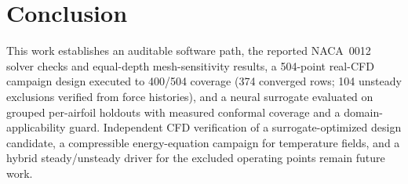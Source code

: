 \documentclass[11pt]{article}
\begin{document}
\section{Conclusion}
\label{sec:conclusion}

This work establishes an auditable software path, the reported NACA~0012
solver checks and equal-depth mesh-sensitivity results, a 504-point real-CFD
campaign design executed to 400/504 coverage (374 converged rows; 104
unsteady exclusions verified from force histories), and a neural surrogate
evaluated on grouped per-airfoil holdouts with measured conformal coverage
and a domain-applicability guard. Independent CFD verification of a
surrogate-optimized design candidate, a compressible energy-equation
campaign for temperature fields, and a hybrid steady/unsteady driver for
the excluded operating points remain future work.



\end{document}
